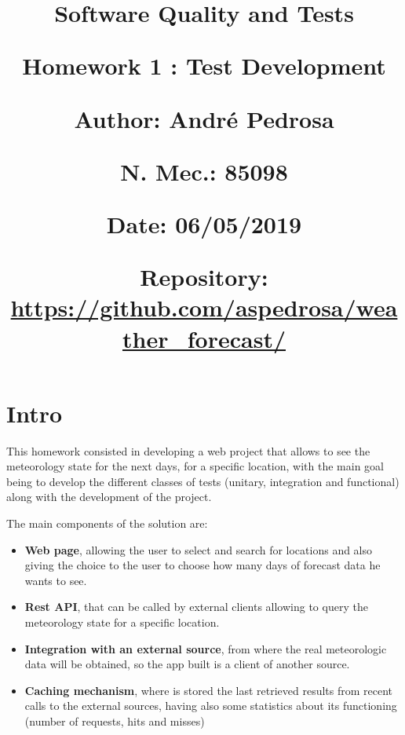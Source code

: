 \documentclass[12pt]{article}
\begin{document}
\title{\vspace{-0.9cm}
       \Large\raggedright\textbf{Software Quality and Tests} \\ 
       \large\raggedright\textbf{Homework 1 : Test Development} \\ 
       \vspace{0.5cm}
       \normalsize
       \raggedright\textbf{Author: \hspace{1.1cm} André Pedrosa} \\ \vspace{0.1cm}
       \raggedright\textbf{N. Mec.: \hspace{0.92cm} 85098} \\ \vspace{0.1cm}
       \raggedright\textbf{Date: \hspace{1.6cm} 06/05/2019} \\ \vspace{0.1cm}
       \raggedright\textbf{Repository: \hspace{0.35cm} \url{https://github.com/aspedrosa/weather\_forecast/}} \\}
\date{} %

\maketitle
\thispagestyle{fancy}

\vspace{-1.4cm}

\tableofcontents

\newpage

\section{Intro}

This homework consisted in developing a web project that allows to see the
  meteorology state for the next days, for a specific location, with the main goal
  being to develop the different classes of tests (unitary, integration and functional)
  along with the development of the project.

The main components of the solution are:
\begin{itemize}
  \item \textbf{Web page}, allowing the user to select and search for locations and also giving
    the choice to the user to choose how many days of forecast data he wants to see.
  \item \textbf{Rest API}, that can be called by external clients allowing to query the
    meteorology state for a specific location.
  \item \textbf{Integration with an external source}, from where the real meteorologic data will be
    obtained, so the app built is a client of another source.
  \item \textbf{Caching mechanism}, where is stored the last retrieved results from recent calls to the
    external sources, having also some statistics about its functioning (number of requests,
    hits and misses)
\end{itemize}
\end{document}
